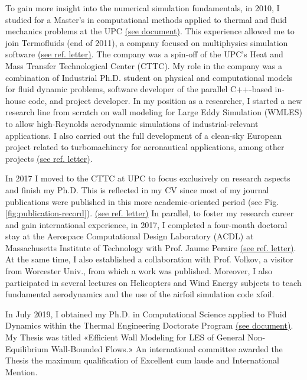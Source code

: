 \documentclass{article}
\begin{document}
To gain more insight into the numerical simulation fundamentals, in 2010, I studied for a Master's in computational methods applied to thermal and fluid mechanics problems at the UPC \hyperlink{master-E.1}{(see document)}. This experience allowed me to join Termofluids (end of 2011), a company focused on multiphysics simulation software \hyperlink{termofluids.1}{(see ref. letter)}. The company was a spin-off of the UPC's Heat and Mass Transfer Technological Center (CTTC).
My role in the company was a combination of Industrial Ph.D. student on physical and computational models for fluid dynamic problems, software developer of the parallel C++-based in-house code, and project developer. In my position as a researcher, I started a new  research line from scratch on wall modeling for Large Eddy Simulation (WMLES) to allow high-Reynolds aerodynamic simulations of industrial-relevant applications.  I also carried out the full development of a clean-sky European project related to turbomachinery for aeronautical applications, among other projects \hyperlink{projectes-tf.1}{(see ref. letter)}. 

 In 2017 I moved to the CTTC at UPC to focus exclusively on research aspects and finish my Ph.D. This is reflected in my CV since most of my journal publications were published in this more academic-oriented period (see Fig. \ref{fig:publication-record}).  \hyperlink{projectes-cttc.1}{(see ref. letter)}
In parallel, to foster my research career and gain international experience, in 2017, I completed a four-month doctoral stay at the Aerospace Computational Design Laboratory (ACDL) at Massachusetts Institute of Technology with Prof. Jaume Peraire \hyperlink{mit.1}{(see ref. letter)}. At the same time, I also established a collaboration with Prof. Volkov, a visitor from Worcester Univ., from which a work was published. Moreover, I also participated in several lectures on Helicopters and Wind Energy subjects to teach fundamental aerodynamics and the use of the airfoil simulation code xfoil. 

In July 2019, I obtained my Ph.D. in Computational Science applied to Fluid Dynamics within the Thermal Engineering Doctorate Program \hyperlink{doctorat.1}{(see document)}. My Thesis was titled «Efficient Wall Modeling for LES of General Non-Equilibrium Wall-Bounded Flows.» An international committee awarded the Thesis the maximum qualification of Excellent cum laude and International Mention.
\end{document}

